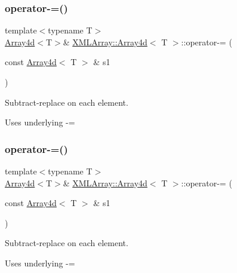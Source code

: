 \subsubsection{\texorpdfstring{operator-\/=()}{operator-=()}\hspace{0.1cm}{\footnotesize\ttfamily [1/3]}}
{\footnotesize\ttfamily template$<$typename T$>$ \\
\mbox{\hyperlink{classXMLArray_1_1Array4d}{Array4d}}$<$T$>$\& \mbox{\hyperlink{classXMLArray_1_1Array4d}{X\+M\+L\+Array\+::\+Array4d}}$<$ T $>$\+::operator-\/= (\begin{DoxyParamCaption}\item[{const \mbox{\hyperlink{classXMLArray_1_1Array4d}{Array4d}}$<$ T $>$ \&}]{s1 }\end{DoxyParamCaption})\hspace{0.3cm}{\ttfamily [inline]}}



Subtract-\/replace on each element. 

Uses underlying -\/= \mbox{\label{classXMLArray_1_1Array4d_ad192d15277494d22a81c86852eaa5466}} 
\subsubsection{\texorpdfstring{operator-\/=()}{operator-=()}\hspace{0.1cm}{\footnotesize\ttfamily [2/3]}}
{\footnotesize\ttfamily template$<$typename T$>$ \\
\mbox{\hyperlink{classXMLArray_1_1Array4d}{Array4d}}$<$T$>$\& \mbox{\hyperlink{classXMLArray_1_1Array4d}{X\+M\+L\+Array\+::\+Array4d}}$<$ T $>$\+::operator-\/= (\begin{DoxyParamCaption}\item[{const \mbox{\hyperlink{classXMLArray_1_1Array4d}{Array4d}}$<$ T $>$ \&}]{s1 }\end{DoxyParamCaption})\hspace{0.3cm}{\ttfamily [inline]}}



Subtract-\/replace on each element. 

Uses underlying -\/= \mbox{\label{classXMLArray_1_1Array4d_ad192d15277494d22a81c86852eaa5466}} 
